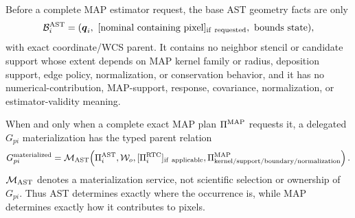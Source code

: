 Before a complete MAP estimator request, the base AST geometry facts are only
\begin{equation}
 \mathcal B^{\rm AST}_{i}=
 (\boldsymbol q_i,\ [\text{nominal containing pixel}]_{\rm if\ requested},
 \ \text{bounds state}),
 \label{eq:geometry-incidence}
\end{equation}
with exact coordinate/WCS parent.  It contains no neighbor stencil or
candidate support whose extent depends on MAP kernel family or radius,
deposition support, edge policy, normalization, or conservation behavior, and
it has no numerical-contribution, MAP-support, response, covariance,
normalization, or estimator-validity meaning.

When and only when a complete exact MAP plan $\Pi^{\rm MAP}$ requests it, a
delegated $G_{pi}$ materialization has the typed parent relation
\begin{equation}
 G_{pi}^{\rm materialized}=
 \mathcal M_{\rm AST}\!\left(
   \Pi^{\rm AST}_{i},\mathcal W_o,
   [\Pi^{\rm RTC}_{i}]_{\rm if\ applicable},
   \Pi^{\rm MAP}_{\rm kernel/support/boundary/normalization}
 \right).
 \label{eq:gpi-parentage}
\end{equation}
$\mathcal M_{\rm AST}$ denotes a materialization service, not scientific
selection or ownership of $G_{pi}$.  Thus AST determines exactly where the
occurrence is, while MAP determines exactly how it contributes to pixels.
